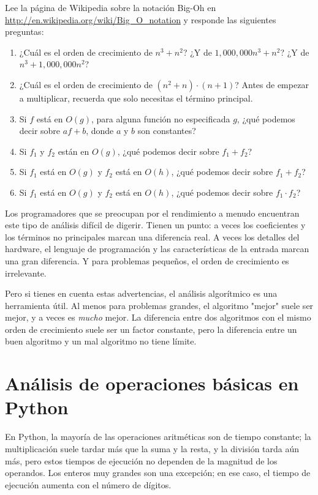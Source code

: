 \begin{exercise}
Lee la página de Wikipedia sobre la notación Big-Oh en \url{http://en.wikipedia.org/wiki/Big_O_notation} y responde las siguientes preguntas:

\begin{enumerate}
    \item ¿Cuál es el orden de crecimiento de \( n^3 + n^2 \)? ¿Y de \( 1,000,000n^3 + n^2 \)? ¿Y de \( n^3 + 1,000,000n^2 \)?
    \item ¿Cuál es el orden de crecimiento de \( (n^2 + n) \cdot (n + 1) \)? Antes de empezar a multiplicar, recuerda que solo necesitas el término principal.
    \item Si \( f \) está en \( O(g) \), para alguna función no especificada \( g \), ¿qué podemos decir sobre \( af + b \), donde \( a \) y \( b \) son constantes?
    \item Si \( f_1 \) y \( f_2 \) están en \( O(g) \), ¿qué podemos decir sobre \( f_1 + f_2 \)?
    \item Si \( f_1 \) está en \( O(g) \) y \( f_2 \) está en \( O(h) \), ¿qué podemos decir sobre \( f_1 + f_2 \)?
    \item Si \( f_1 \) está en \( O(g) \) y \( f_2 \) está en \( O(h) \), ¿qué podemos decir sobre \( f_1 \cdot f_2 \)?
\end{enumerate}
\end{exercise}

Los programadores que se preocupan por el rendimiento a menudo encuentran este tipo de análisis difícil de digerir. Tienen un punto: a veces los coeficientes y los términos no principales marcan una diferencia real. A veces los detalles del hardware, el lenguaje de programación y las características de la entrada marcan una gran diferencia. Y para problemas pequeños, el orden de crecimiento es irrelevante.

Pero si tienes en cuenta estas advertencias, el análisis algorítmico es una herramienta útil. Al menos para problemas grandes, el algoritmo "mejor" suele ser mejor, y a veces es \textit{mucho} mejor. La diferencia entre dos algoritmos con el mismo orden de crecimiento suele ser un factor constante, pero la diferencia entre un buen algoritmo y un mal algoritmo no tiene límite.

\section{Análisis de operaciones básicas en Python}

En Python, la mayoría de las operaciones aritméticas son de tiempo constante; la multiplicación suele tardar más que la suma y la resta, y la división tarda aún más, pero estos tiempos de ejecución no dependen de la magnitud de los operandos. Los enteros muy grandes son una excepción; en ese caso, el tiempo de ejecución aumenta con el número de dígitos.

